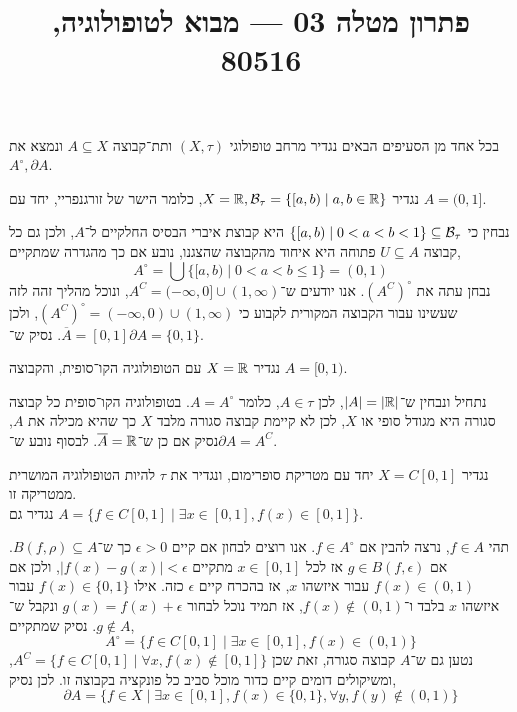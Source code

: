 
\title{פתרון מטלה 03 --- מבוא לטופולוגיה, 80516}


\maketitle
\maketitleprint{}

\question[2]
בכל אחד מן הסעיפים הבאים נגדיר מרחב טופולוגי $(X, \tau)$ ותת־קבוצה $A \subseteq X$ ונמצא את $A^\circ, \partial A$.

\subquestion{}
נגדיר $X = \mathbb{R}, \mathcal{B}_{\tau} = \{ [a, b) \mid a, b \in \mathbb{R} \}$, כלומר הישר של זורגנפריי,  יחד עם $A = (0, 1]$.
\begin{solution}
	נבחין כי $\{ [a, b) \mid 0 < a < b < 1 \} \subseteq \mathcal{B}_{\tau}$ היא קבוצת איברי הבסיס החלקיים ל־$A$, ולכן גם כל קבוצה $U \subseteq A$ פתוחה היא איחוד מהקבוצה שהצגנו,
	נובע אם כך מהגדרה שמתקיים,
	\[
		A^\circ
		= \bigcup \{ [a, b) \mid 0 < a < b \le 1 \}
		= (0, 1)
	\]
	נבחן עתה את ${(A^C)}^\circ$.
	אנו יודעים ש־$A^C = (-\infty, 0] \cup (1, \infty)$, ונוכל מהליך זהה לזה שעשינו עבור הקבוצה המקורית לקבוע כי ${(A^C)}^\circ = (-\infty, 0) \cup (1, \infty)$, ולכן $\overline{A} = [0, 1]$.
	נסיק ש־$\partial A = \{0, 1\}$.
\end{solution}

\subquestion{}
נגדיר $X = \mathbb{R}$ עם הטופולוגיה הקו־סופית, והקבוצה $A = [0, 1)$.
\begin{solution}
	נתחיל ונבחין ש־$|A| = |\mathbb{R}|$, לכן $A \in \tau$, כלומר $A = A^\circ$.
	בטופולוגיה הקו־סופית כל קבוצה סגורה היא מגודל סופי או $X$, לכן לא קיימת קבוצה סגורה מלבד $X$ כך שהיא מכילה את $A$, נסיק אם כן ש־$\overline{A} = \mathbb{R}$.
	לבסוף נובע ש־$\partial A = A^C$.
\end{solution}

\subquestion{}
נגדיר $X = C[0, 1]$ יחד עם מטריקת סופרימום, ונגדיר את $\tau$ להיות הטופולוגיה המושרית ממטריקה זו. \\
נגדיר גם $A = \{ f \in C[0, 1] \mid \exists x \in [0, 1], f(x) \in [0, 1] \}$.
\begin{solution}
	תהי $f \in A$, נרצה להבין אם $f \in A^\circ$.
	אנו רוצים לבחון אם קיים $\epsilon > 0$ כך ש־$B(f, \rho) \subseteq A$.
	אם $g \in B(f, \epsilon)$ אז לכל $x \in [0, 1]$ מתקיים $|f(x) - g(x)| < \epsilon$, ולכן אם $f(x) \in (0, 1)$ עבור איזשהו $x$, אז בהכרח קיים $\epsilon$ כזה.
	אילו $f(x) \in \{0, 1\}$ עבור איזשהו $x$ בלבד ו־$f(x) \notin (0, 1)$, אז תמיד נוכל לבחור $g(x) = f(x) + \epsilon$ ונקבל ש־$g \notin A$.
	נסיק שמתקיים,
	\[
		A^\circ
		= \{ f \in C[0, 1] \mid \exists x \in [0, 1], f(x) \in (0, 1) \}
	\]
	נטען גם ש־$A$ קבוצה סגורה, זאת שכן $A^C = \{ f \in C[0, 1] \mid \forall x, f(x) \notin [0, 1] \}$, ומשיקולים דומים קיים כדור מוכל סביב כל פונקציה בקבוצה זו.
	לכן נסיק,
	\[
		\partial A
		= \{ f \in X \mid \exists x \in [0, 1], f(x) \in \{0, 1\}, \forall y, f(y) \notin (0, 1) \}
	\]
\end{solution}

